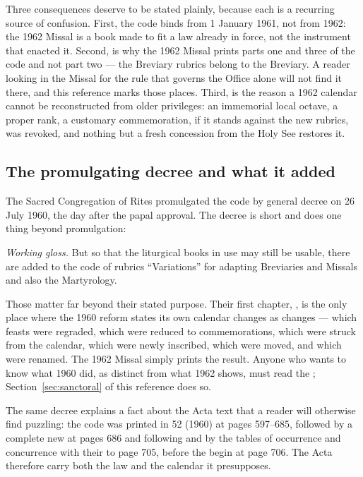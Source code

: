 Three consequences deserve to be stated plainly, because each is a recurring source of
confusion. First, the code binds from 1 January 1961, not from 1962: the 1962 Missal is a book
made to fit a law already in force, not the instrument that enacted it. Second,  is why
the 1962 Missal prints parts one and three of the code and not part two — the Breviary rubrics
belong to the Breviary. A reader looking in the Missal for the rule that governs the Office
alone will not find it there, and this reference marks those places. Third,  is the
reason a 1962 calendar cannot be reconstructed from older privileges: an immemorial local
octave, a proper rank, a customary commemoration, if it stands against the new rubrics, was
revoked, and nothing but a fresh concession from the Holy See restores it.

\subsection{The promulgating decree and what it added}

The Sacred Congregation of Rites promulgated the code by general decree on 26 July 1960, the
day after the papal approval. The decree is short and does one thing beyond promulgation:

\begin{studyframe}
\medskip

\textit{Working gloss.} But so that the liturgical books in use may still be usable, there are
added to the code of rubrics ``Variations'' for adapting Breviaries and Missals and also the
Martyrology.
\end{studyframe}

Those  matter far beyond their stated purpose. Their first chapter,
, is the only place where the 1960 reform states its own
calendar changes as changes — which feasts were regraded, which were reduced to
commemorations, which were struck from the calendar, which were newly inscribed, which were
moved, and which were renamed. The 1962 Missal simply prints the result. Anyone who wants to
know what 1960 did, as distinct from what 1962 shows, must read the ;
Section~\ref{sec:sanctoral} of this reference does so.

The same decree explains a fact about the Acta text that a reader will otherwise find puzzling:
the code was printed in  52 (1960) at pages 597--685, followed by
a complete new  at pages 686 and following and by
the tables of occurrence and concurrence with their  to page 705, before the
 begin at page 706. The Acta therefore carry both the law and the
calendar it presupposes.

